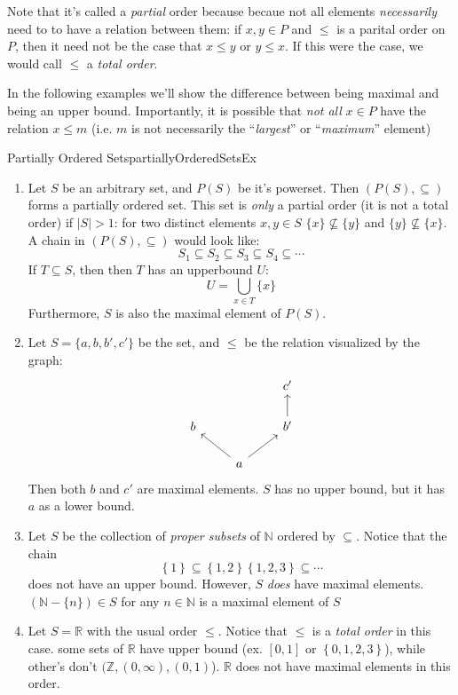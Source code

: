 \documentclass[oneside]{book}
\newcommand{\N}{\mathbb{N}}
\newcommand{\R}{\mathbb{R}}
\newcommand{\Z}{\mathbb{Z}}
\newcommand{\sse}{\subseteq}
\begin{document}
Note that it's called a \emph{partial} order because becaue not all elements \emph{necessarily} need to to have
a relation between them: if $x,y \in P$ and $\le$ is a parital order on $P$, then it need not be the case that $x \le y$
or $y \le x$. If this were the case, we would call $\le$ a \emph{total order}.

In the following examples we'll show the difference between being maximal and being an upper bound. Importantly, it is
possible that \emph{not all} $x \in P$ have the relation $x \le m$ (i.e. $m$ is not necessarily the ``\emph{largest}'' or
``\emph{maximum}'' element)

\begin{example}{Partially Ordered Sets}{partiallyOrderedSetsEx}
	\begin{enumerate}
		\item Let $S$ be an arbitrary set, and $P(S)$ be it's powerset. Then $(P(S), \sse)$ forms a partially ordered
			set. This set is \emph{only} a partial order (it is not a total order) if $|S| > 1$: for two distinct elements $x,y \in
			S$ $\{x\} \not\sse \{y\}$ and $\{y\} \not\sse \{x\}$. A chain in $(P(S), \sse)$ would look like:
			\[
				S_1 \sse S_2 \sse S_3 \sse S_4 \sse \cdots
			\]
			If $T \sse S$, then then $T$ has an upperbound $U$:
			\[
				U = \bigcup_{x \in T} \{x\}
			\]
			Furthermore, $S$ is also the maximal element of $P(S)$.
		\item Let $S = \{a,b,b',c'\}$ be the set, and $\le$ be the relation visualized by the graph:
			\[
				\begin{tikzcd}
  &                         & c'           \\
b &                         & b' \arrow[u] \\
  & a \arrow[lu] \arrow[ru] &
\end{tikzcd}
			\]
			Then both $b$ and $c'$ are maximal elements. $S$ has no upper bound, but it has $a$ as a lower bound.
		\item Let $S$ be the collection of \emph{proper subsets} of $\N$ ordered by $\sse$. Notice that the chain
			\[
			\left\{ 1 \right\} \sse \left\{ 1,2 \right\} \left\{ 1,2,3 \right\} \sse \cdots
			\]
			does not have an upper bound. However, $S$ \emph{does} have maximal elements. $(\N - \{n\}) \in S$ for any
			$n \in \N$ is a maximal element of $S$
		\item Let $S = \R$ with the usual order $\le$. Notice that $\le$ is a \emph{total order} in this case. some sets
			of $\R$ have upper bound (ex. $[0,1]$ or $ \left\{ 0,1,2,3 \right\}$), while other's don't $(\Z, (0,
			\infty), (0,1)$). $\R$ does not have maximal elements in this order.
	\end{enumerate}
\end{example}
\end{document}
